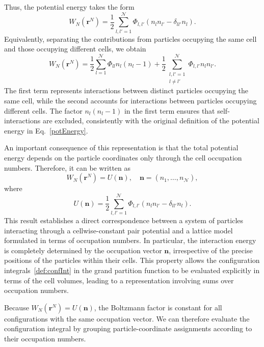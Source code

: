 \documentclass[12pt]{article}
\begin{document}
	Thus, the potential energy takes the form
	\begin{equation}
		W_N(\mathbf{r}^N) = \frac{1}{2} \sum_{l,l' = 1}^{\mathcal{N}} \Phi_{l, {l'}} (n_l n_{l'} - \delta_{ll'} n_l).
	\end{equation}
	Equivalently, separating the contributions from particles occupying the same cell and those occupying different cells, we obtain
	\begin{equation}
		W_N(\mathbf{r}^N) = \frac{1}{2} \sum_{l=1}^{\mathcal{N}} \Phi_{ll} n_l (n_l - 1) + \frac{1}{2} \sum_{\substack{l,l'=1 \\ l \ne l'}}^{\mathcal{N}} \Phi_{l, {l'}} n_l n_{l'}.
	\end{equation}
	The first term represents interactions between distinct particles occupying the same cell, while the second accounts for interactions between particles occupying different cells. The factor $n_l (n_l - 1)$ in the first term ensures that self-interactions are excluded, consistently with the original definition of the potential energy in Eq.~\eqref{potEnergy}.
	
	An important consequence of this representation is that the total potential energy depends on the particle coordinates only through the cell occupation numbers. Therefore, it can be written as
	\begin{equation}
		W_N(\mathbf{r}^N) = U(\mathbf{n}), \quad \mathbf{n} = (n_1, \ldots, n_{\mathcal{N}}),
	\end{equation}
	where
	\begin{equation}
		U(\mathbf{n}) = \frac{1}{2} \sum_{l,l' = 1}^{\mathcal{N}} \Phi_{l, {l'}} (n_l n_{l'} - \delta_{ll'} n_l).
	\end{equation}
	This result establishes a direct correspondence between a system of particles interacting through a cellwise-constant pair potential and a lattice model formulated in terms of occupation numbers. In particular, the interaction energy is completely determined by the occupation vector $\mathbf{n}$, irrespective of the precise positions of the particles within their cells. This property allows the configuration integrals~\eqref{def:confInt} in the grand partition function to be evaluated explicitly in terms of the cell volumes, leading to a representation involving sums over occupation numbers.
	
	Because $W_N(\mathbf r^N)=U(\mathbf{n})$, the Boltzmann factor is constant for all configurations with the same occupation vector. We can therefore evaluate the configuration integral by grouping particle-coordinate assignments according to their occupation numbers.
	
\end{document}
